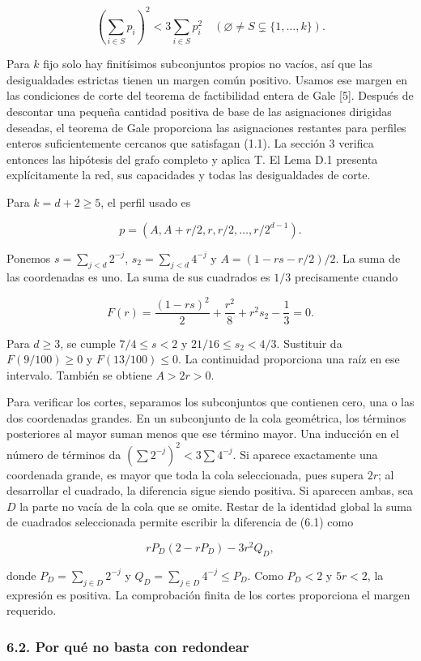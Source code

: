 \documentclass[spanish,11pt,a4paper]{article}
\begin{document}
\[\left(\sum_{i\in S}p_i\right)^2<3\sum_{i\in S}p_i^2
\quad(\varnothing\ne S\subsetneq\{1,\ldots,k\}).\tag{6.1}\]

Para \(k\) fijo solo hay finitísimos subconjuntos propios no vacíos, así que las desigualdades estrictas tienen un margen común positivo. Usamos ese margen en las condiciones de corte del teorema de factibilidad entera de Gale {[}5{]}. Después de descontar una pequeña cantidad positiva de base de las asignaciones dirigidas deseadas, el teorema de Gale proporciona las asignaciones restantes para perfiles enteros suficientemente cercanos que satisfagan (1.1). La sección 3 verifica entonces las hipótesis del grafo completo y aplica T. El Lema D.1 presenta explícitamente la red, sus capacidades y todas las desigualdades de corte.

Para \(k=d+2\ge5\), el perfil usado es

\[p=(A,A+r/2,r,r/2,\ldots,r/2^{d-1}).\]

Ponemos \(s=\sum_{j<d}2^{-j}\), \(s_2=\sum_{j<d}4^{-j}\) y \(A=(1-rs-r/2)/2\). La suma de las coordenadas es uno. La suma de sus cuadrados es \(1/3\) precisamente cuando

\[F(r)=\frac{(1-rs)^2}{2}+\frac{r^2}{8}+r^2s_2-\frac13=0.\]

Para \(d\ge3\), se cumple \(7/4\le s<2\) y \(21/16\le s_2<4/3\). Sustituir da \(F(9/100)\ge0\) y \(F(13/100)\le0\). La continuidad proporciona una raíz en ese intervalo. También se obtiene \(A>2r>0\).

Para verificar los cortes, separamos los subconjuntos que contienen cero, una o las dos coordenadas grandes. En un subconjunto de la cola geométrica, los términos posteriores al mayor suman menos que ese término mayor. Una inducción en el número de términos da \((\sum 2^{-j})^2<3\sum4^{-j}\). Si aparece exactamente una coordenada grande, es mayor que toda la cola seleccionada, pues supera \(2r\); al desarrollar el cuadrado, la diferencia sigue siendo positiva. Si aparecen ambas, sea \(D\) la parte no vacía de la cola que se omite. Restar de la identidad global la suma de cuadrados seleccionada permite escribir la diferencia de (6.1) como

\[rP_D(2-rP_D)-3r^2Q_D,\]

donde \(P_D=\sum_{j\in D}2^{-j}\) y \(Q_D=\sum_{j\in D}4^{-j}\le P_D\). Como \(P_D<2\) y \(5r<2\), la expresión es positiva. La comprobación finita de los cortes proporciona el margen requerido.

\subsubsection{6.2. Por qué no basta con redondear}\label{por-quuxe9-no-basta-con-redondear}
\end{document}

